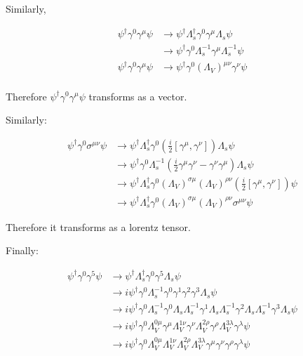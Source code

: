 \documentclass{article}
\begin{document}
Similarly, 

\begin{align*}
\psi^\dagger \gamma^0 \gamma^\mu \psi
& \to \psi^\dagger \Lambda_s^\dagger \gamma^0 \gamma^\mu \Lambda_s \psi\\
& \to \psi^\dagger \gamma^0 \Lambda_s^{-1} \gamma^\mu \Lambda_s^{-1} \psi\\
\psi^\dagger \gamma^0 \gamma^\mu \psi
& \to \psi^\dagger \gamma^0 (\Lambda_V)^{\mu \nu} \gamma^\nu \psi \\
\end{align*}

Therefore $\psi^\dagger \gamma^0 \gamma^\mu \psi$ transforms as a vector.

Similarly:

\begin{align*}
\psi^\dagger \gamma^0 \sigma^{\mu \nu} \psi
& \to \psi^\dagger \Lambda_s^\dagger \gamma^0 
	\left( \frac i2 [ \gamma^\mu, \gamma^\nu ] \right) \Lambda_s \psi\\
& \to \psi^\dagger \gamma^0 \Lambda_s^{-1}
	\left( \frac i2 \gamma^\mu \gamma^\nu - \gamma^\nu \gamma^\mu \right) \Lambda_s \psi\\
& \to \psi^\dagger \Lambda_s^\dagger \gamma^0
	(\Lambda_V)^{\sigma \mu} (\Lambda_V)^{\rho \nu}
	\left( \frac i2 [ \gamma^\mu, \gamma^\nu ] \right)\psi\\
& \to \psi^\dagger \Lambda_s^\dagger \gamma^0
	(\Lambda_V)^{\sigma \mu} (\Lambda_V)^{\rho \nu}
	\sigma^{\mu \nu}\psi
\end{align*}

Therefore it transforms as a lorentz tensor.

Finally:

\begin{align*}
\psi^\dagger \gamma^0 \gamma^5 \psi
& \to \psi^\dagger \Lambda_s^\dagger \gamma^0 \gamma^5 \Lambda_s \psi \\
& \to i \psi^\dagger \gamma^0 \Lambda_s^{-1} 
	\gamma^0 \gamma^1 \gamma^2 \gamma^3 \Lambda_s \psi\\
& \to i \psi^\dagger \gamma^0 \Lambda_s^{-1} \gamma^0 \Lambda_s
	\Lambda_s^{-1} \gamma^1 \Lambda_s
	\Lambda_s^{-1} \gamma^2 \Lambda_s
	\Lambda_s^{-1} \gamma^3 \Lambda_s \psi\\
& \to i \psi^\dagger \gamma^0 
	\Lambda_V^{0 \mu} \gamma^\mu
	\Lambda_V^{1 \nu} \gamma^\nu
	\Lambda_V^{2 \rho} \gamma^\rho
	\Lambda_V^{3 \lambda} \gamma^\lambda \psi\\
& \to i \psi^\dagger \gamma^0 
	\Lambda_V^{0 \mu}
	\Lambda_V^{1 \nu} 
	\Lambda_V^{2 \rho} 
	\Lambda_V^{3 \lambda} 
	\gamma^\mu
	\gamma^\nu
	\gamma^\rho
	\gamma^\lambda \psi\\
\end{align*}
\end{document}
